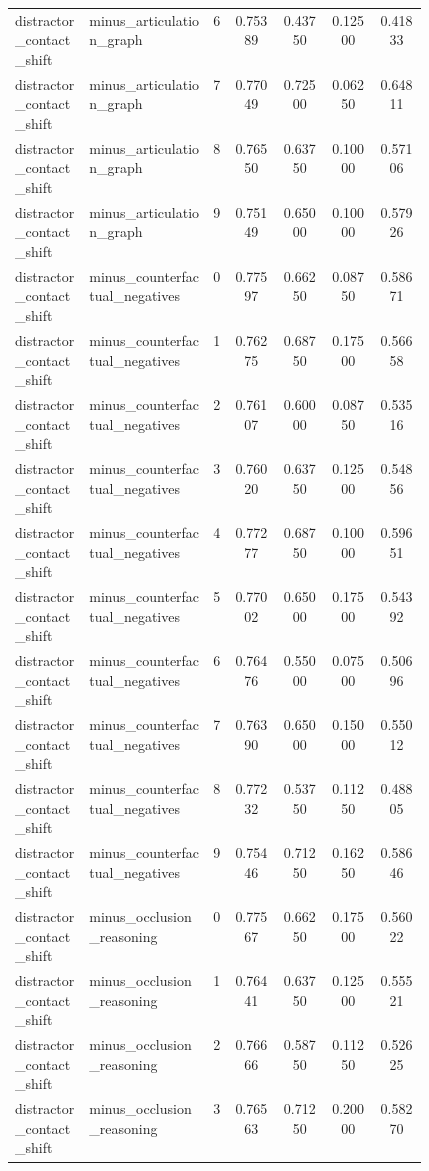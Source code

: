 \documentclass{article}
\begin{document}
\begin{center}
\begin{longtable}{p{0.18\linewidth}p{0.30\linewidth}ccccc}
distractor\_contact\_shift & minus\_articulation\_graph & 6 & 0.75389 & 0.43750 & 0.12500 & 0.41833\\
distractor\_contact\_shift & minus\_articulation\_graph & 7 & 0.77049 & 0.72500 & 0.06250 & 0.64811\\
distractor\_contact\_shift & minus\_articulation\_graph & 8 & 0.76550 & 0.63750 & 0.10000 & 0.57106\\
distractor\_contact\_shift & minus\_articulation\_graph & 9 & 0.75149 & 0.65000 & 0.10000 & 0.57926\\
distractor\_contact\_shift & minus\_counterfactual\_negatives & 0 & 0.77597 & 0.66250 & 0.08750 & 0.58671\\
distractor\_contact\_shift & minus\_counterfactual\_negatives & 1 & 0.76275 & 0.68750 & 0.17500 & 0.56658\\
distractor\_contact\_shift & minus\_counterfactual\_negatives & 2 & 0.76107 & 0.60000 & 0.08750 & 0.53516\\
distractor\_contact\_shift & minus\_counterfactual\_negatives & 3 & 0.76020 & 0.63750 & 0.12500 & 0.54856\\
distractor\_contact\_shift & minus\_counterfactual\_negatives & 4 & 0.77277 & 0.68750 & 0.10000 & 0.59651\\
distractor\_contact\_shift & minus\_counterfactual\_negatives & 5 & 0.77002 & 0.65000 & 0.17500 & 0.54392\\
distractor\_contact\_shift & minus\_counterfactual\_negatives & 6 & 0.76476 & 0.55000 & 0.07500 & 0.50696\\
distractor\_contact\_shift & minus\_counterfactual\_negatives & 7 & 0.76390 & 0.65000 & 0.15000 & 0.55012\\
distractor\_contact\_shift & minus\_counterfactual\_negatives & 8 & 0.77232 & 0.53750 & 0.11250 & 0.48805\\
distractor\_contact\_shift & minus\_counterfactual\_negatives & 9 & 0.75446 & 0.71250 & 0.16250 & 0.58646\\
distractor\_contact\_shift & minus\_occlusion\_reasoning & 0 & 0.77567 & 0.66250 & 0.17500 & 0.56022\\
distractor\_contact\_shift & minus\_occlusion\_reasoning & 1 & 0.76441 & 0.63750 & 0.12500 & 0.55521\\
distractor\_contact\_shift & minus\_occlusion\_reasoning & 2 & 0.76666 & 0.58750 & 0.11250 & 0.52625\\
distractor\_contact\_shift & minus\_occlusion\_reasoning & 3 & 0.76563 & 0.71250 & 0.20000 & 0.58270\\

\end{longtable}
\end{center}
\end{document}

